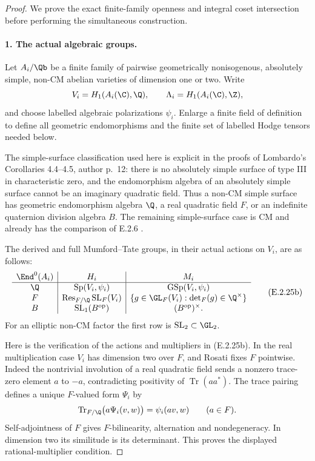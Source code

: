\begin{proof}
We prove the exact finite-family openness and integral
coset intersection before performing the simultaneous
construction.

\paragraph{1. The actual algebraic groups.}
Let \(A_i/\Qb\) be a finite family of pairwise
geometrically nonisogenous, absolutely simple, non-CM
abelian varieties of dimension one or two. Write
\[
 V_i=H_1(A_i(\C),\Q),\qquad
 \Lambda_i=H_1(A_i(\C),\Z),
\]
and choose labelled algebraic polarizations \(\psi_i\).
Enlarge a finite field of definition to define all
geometric endomorphisms and the finite set of labelled
Hodge tensors needed below.

The simple-surface classification used here is explicit
in the proofs of Lombardo's Corollaries 4.4--4.5,
author p.~12: there is no absolutely simple surface of
type III in characteristic zero, and the endomorphism
algebra of an absolutely simple surface cannot be an
imaginary quadratic field. Thus a non-CM simple surface
has geometric endomorphism algebra \(\Q\), a real
quadratic field \(F\), or an indefinite quaternion
division algebra \(B\). The remaining simple-surface
case is CM and already has the comparison of E.2.6
\cite[Corollaries 4.4--4.5 and their proofs, p.~12]
{GenLombardoNonsimple2015}.

The derived and full Mumford--Tate groups, in their
actual actions on \(V_i\), are as follows:
\[
\begin{array}{c|c|c}
 \End^0(A_i)&H_i&M_i\\ \hline
 \Q&\operatorname{Sp}(V_i,\psi_i)
       &\operatorname{GSp}(V_i,\psi_i)\\
 F&\operatorname{Res}_{F/\Q}\operatorname{SL}_{F}(V_i)
       &\{g\in\GL_F(V_i):\det_F(g)\in\Q^\times\}\\
 B&\operatorname{SL}_1(B^{\mathrm{op}})
       &(B^{\mathrm{op}})^\times .
\end{array}
\tag{E.2.25b}
\]
For an elliptic non-CM factor the first row is
\(\operatorname{SL}_2\subset\GL_2\).

Here is the verification of the actions and multipliers
in (E.2.25b). In the real multiplication case \(V_i\)
has dimension two over \(F\), and Rosati fixes \(F\)
pointwise. Indeed the nontrivial involution of a real
quadratic field sends a nonzero trace-zero element
\(a\) to \(-a\), contradicting positivity of
\(\operatorname{Tr}(aa^*)\). The trace pairing defines
a unique \(F\)-valued form \(\Psi_i\) by
\[
 \operatorname{Tr}_{F/\Q}\bigl(a\Psi_i(v,w)\bigr)
                  =\psi_i(av,w)\qquad(a\in F).
\]
Self-adjointness of \(F\) gives \(F\)-bilinearity,
alternation and nondegeneracy. In dimension two its
similitude is its determinant. This proves the displayed
rational-multiplier condition.


\end{proof}
